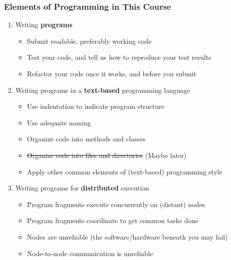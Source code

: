 \begin{frame}

\frametitle{Elements of Programming in This Course}

\begin{enumerate}

\item Writing \textbf{programs}

\begin{itemize}

\footnotesize

\item Submit readable, preferably working code

\item Test your code, and tell us how to reproduce your test results

\item Refactor your code once it works, and before you submit

\end{itemize}

\item Writing programs in a \textbf{text-based} programming language

\begin{itemize}

\footnotesize

\item Use indentation to indicate program structure

\item Use adequate naming

\item Organize code into methods and classes

\item \sout{Organize code into files and directories} (Maybe later)

\item Apply other common elements of (text-based) programming style

\end{itemize}

\item Writing programs for \textbf{distributed} execution

\begin{itemize}

\footnotesize

\item Program fragments execute concurrently on (distant) nodes

\item Program fragments coordinate to get common tasks done

\item Nodes are unreliable (the software/hardware beneath you may fail)

\item Node-to-node communication is unreliable

\end{itemize}

\end{enumerate}

\end{frame}
